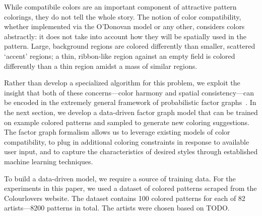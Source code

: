 While compatibile colors are an important component of attractive pattern colorings, they do not tell the whole story. The notion of color compatibility, whether implemented via the O'Donovan model or any other, considers colors abstractly: it does not take into account how they will be spatially used in the pattern. Large, background regions are colored differently than smaller, scattered `accent' regions; a thin, ribbon-like region against an empty field is colored differently than a thin region amidst a mass of similar regions.

Rather than develop a specialized algorithm for this problem, we exploit the insight that both of these concerns---color harmony and spatial consistency---can be encoded in the extremely general framework of probabilistic factor graphs~\cite{FactorGraphs}. In the next section, we develop a data-driven factor graph model that can be trained on example colored patterns and sampled to generate new coloring suggestions. The factor graph formalism allows us to leverage existing models of color compatibility, to plug in additional coloring constraints in response to available user input, and to capture the characteristics of desired styles through established machine learning techniques.

To build a data-driven model, we require a source of training data. For the experiments in this paper, we used a dataset of colored patterns scraped from the Colourlovers website. The dataset contains 100 colored patterns for each of 82 artists---8200 patterns in total. The artists were chosen based on TODO.~